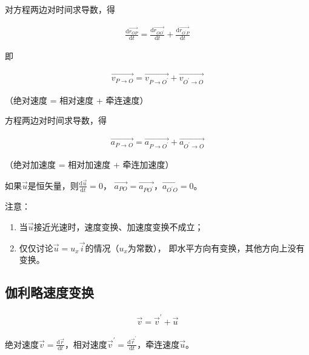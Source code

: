 \documentclass[
	12pt, %
	a4paper, %
]{myLegrandOrangeBook}
\newcommand{\rmd}{\mathrm{d}}
\newcommand{\deriv}[2]{\frac{\rmd #1}{\rmd #2}}
\begin{document}
    对方程两边对时间求导数，得

    \begin{align*}
        \deriv{\overrightarrow{r_{OP}}}{t} = \deriv{\overrightarrow{r_{OO^{'}}}}{t} +
        \deriv{\overrightarrow{r_{O^{'}P}}}{t}
    \end{align*}

    即

    \begin{align}
        \overrightarrow{v_{P \rightarrow O}} = \overrightarrow{v_{P \rightarrow O^{'}}} +
        \overrightarrow{v_{O^{'} \rightarrow O}}
    \end{align}

    （绝对速度 = 相对速度 + 牵连速度）

    方程两边对时间求导数，得

    \begin{align}
        \overrightarrow{a_{P \rightarrow O}} = \overrightarrow{a_{P \rightarrow O^{'}}} +
        \overrightarrow{a_{O^{'} \rightarrow O}}
    \end{align}

    （绝对加速度 = 相对加速度 + 牵连加速度）

    如果\(\overrightarrow{u}\)是恒矢量，则\(\deriv{\overrightarrow{u}}{t} = 0\)，
    \(\overrightarrow{a_{PO}} = \overrightarrow{a_{PO^{'}}}\)，\(\overrightarrow{a_{O^{'}O}} = 0\)。

    注意：

    \begin{enumerate}
        \item 当\(\overrightarrow{u}\)接近光速时，速度变换、加速度变换不成立；
        \item 仅仅讨论\(\overrightarrow{u} = u_x \overrightarrow{i}\)的情况（\(u_x\)为常数），
        即水平方向有变换，其他方向上没有变换。
    \end{enumerate}

\subsection{伽利略速度变换}

    \vspace{1em}
    \begin{definition}[角加速度]

        \begin{align}
            \overrightarrow{v} = \overrightarrow{v}^{'} + \overrightarrow{u}
        \end{align}

        绝对速度\(\overrightarrow{v} = \deriv{\overrightarrow{r}}{t}\)，相对速度\(\overrightarrow{v}^{'} =
        \deriv{\overrightarrow{r}^{'}}{t}\)，牵连速度\(\overrightarrow{u}\)。

    \end{definition}
\end{document}
